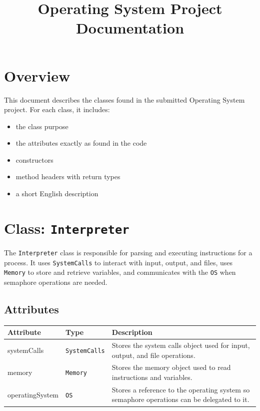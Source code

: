 \documentclass[12pt,a4paper]{article}
\title{\textbf{\textcolor{mainblue}{Operating System Project Documentation}}}
\author{}
\date{}
\begin{document}
\maketitle
\tableofcontents
\newpage

\section{Overview}

This document describes the classes found in the submitted Operating System project.  
For each class, it includes:
\begin{itemize}[leftmargin=1.5em]
    \item the class purpose
    \item the attributes exactly as found in the code
    \item constructors
    \item method headers with return types
    \item a short English description
\end{itemize}

\section{Class: \texttt{Interpreter}}

\begin{purposebox}
The \texttt{Interpreter} class is responsible for parsing and executing instructions for a process. It uses \texttt{SystemCalls} to interact with input, output, and files, uses \texttt{Memory} to store and retrieve variables, and communicates with the \texttt{OS} when semaphore operations are needed.
\end{purposebox}

\subsection{Attributes}

\begin{tabularx}{\textwidth}{p{4cm} p{3cm} Y}
\toprule
\textbf{Attribute} & \textbf{Type} & \textbf{Description} \\
\midrule
systemCalls & \texttt{SystemCalls} & Stores the system calls object used for input, output, and file operations. \\
memory & \texttt{Memory} & Stores the memory object used to read instructions and variables. \\
operatingSystem & \texttt{OS} & Stores a reference to the operating system so semaphore operations can be delegated to it. \\
\bottomrule
\end{tabularx}
\end{document}
